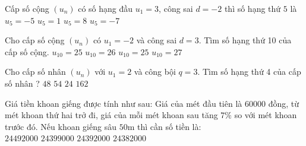 \begin{ex}
Cấp số cộng $(u_n)$ có số hạng đầu $u_1=3$, công sai $d=-2$ thì số hạng thứ $5$ là
\choice
{\True $u_5=-5$}
{$u_5=1$}
{$u_5=8$}
{$u_5=-7$}
\end{ex}
\begin{ex}
Cho cấp số cộng $(u_n)$ có $u_1=-2$ và công sai $d=3$. Tìm số hạng thứ 10 của cấp số cộng.
\choice
{$u_{10}=25$}
{$u_{10}=26$}
{\True $u_{10}=25$}
{$u_{10}=27$}
\end{ex}
\begin{ex}
Cho cấp số nhân $(u_n)$ với $u_1=2$ và công bội $q=3$. Tìm số hạng thứ 4 của cấp số nhân ?
\choice
{$48$}
{\True $54$}
{$24$}
{$162$}
\end{ex}
\begin{ex}
Giá tiền khoan giếng được tính như sau: Giá của mét đầu tiên là $60000$ đồng, từ mét khoan thứ hai trở đi, giá của mỗi mét khoan sau tăng $7\%$ so với mét khoan trước đó. Nếu khoan giếng sâu $50\text{m}$ thì cần số tiền là:
\choice\\
{$24492000$}
{$24399000$}
{\True $24392000$}
{$24382000$}
\end{ex}
